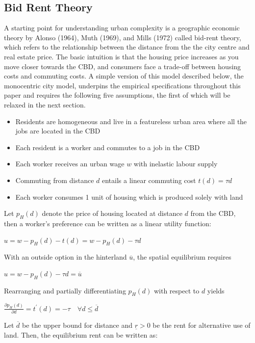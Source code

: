 \documentclass{article}
\begin{document}
\subsection{Bid Rent Theory}
A starting point for understanding urban complexity is a geographic economic theory by Alonso (1964), Muth (1969), and Mills (1972) called bid-rent theory, which refers to the relationship between the distance from the the city centre and real estate price. The basic intuition is that the housing price increases as you move closer towards the CBD, and consumers face a trade-off between housing costs and commuting costs. A simple version of this model described below, the monocentric city model, underpins the empirical specifications throughout this paper and requires the following five assumptions, the first of which will be relaxed in the next section.
\begin{itemize}
\setlength\itemsep{0.1em}
\item Residents are homogeneous and live in a featureless urban area where all the jobs are located in the CBD
\item Each resident is a worker and commutes to a job in the CBD
\item Each worker receives an urban wage $w$ with inelastic labour supply
\item Commuting from distance $d$ entails a linear commuting cost $t(d) = \tau d$
\item Each worker consumes 1 unit of housing which is produced solely  with land
\end{itemize}
Let $p_H (d)$ denote the price of housing located at distance $d$ from the CBD, then a worker's preference can be written as a linear utility function:
\begin{center}
$u = w - p _ { H } ( d ) - t ( d ) = w - p _ { H } ( d ) - \tau d$
\end{center}
With an outside option in the hinterland $\overline{u}$, the spatial equilibrium requires
\begin{center}
$u = w - p _ { H } ( d ) - \tau d = \overline { u }$
\end{center}
Rearranging and partially differentiating $p_H (d)$ with respect to $d$ yields 
\begin{center}
$\frac { \partial p _ { H } ( d ) } { \partial d } = t ^ { \prime } ( d ) = - \tau \quad \forall d \leq \overline { d }$
\end{center}
Let $\overline{d}$ be the upper bound for distance and $\underline{r} > 0$ be the rent for alternative use of land. Then, the equilibrium rent can be written as:
\end{document}
